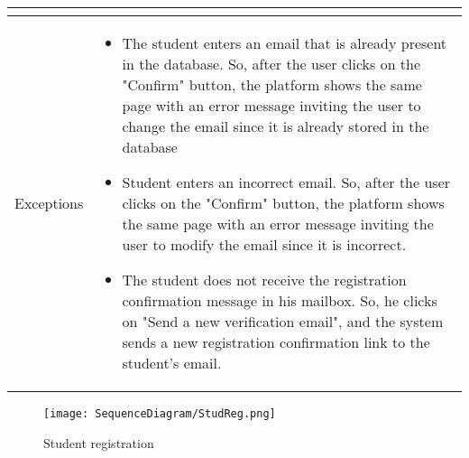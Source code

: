 \begin{longtable}{|c| p{10cm}|}
\begin{itemize}
\end{itemize}\\
\hline
Exceptions &
\begin{itemize}
\item The student enters an email that is already present in the database. So, after the user clicks on the "Confirm" button, the platform shows the same page with an error message inviting the user to change the email since it is already stored in the database
\item Student enters an incorrect email. So, after the user clicks on the "Confirm" button, the platform shows the same page with an error message inviting the user to modify the email since it is incorrect.
\item The student does not receive the registration confirmation message in his mailbox. So, he clicks on "Send a new verification email", and the system sends a new registration confirmation link to the student's email.
\end{itemize}\\
\hline
\end{longtable}

    \begin{figure}[H]
  \texttt{[image: SequenceDiagram/StudReg.png]} 
  \caption{Student registration}
  \label{fig:immagine}
\end{figure}

\newpage
